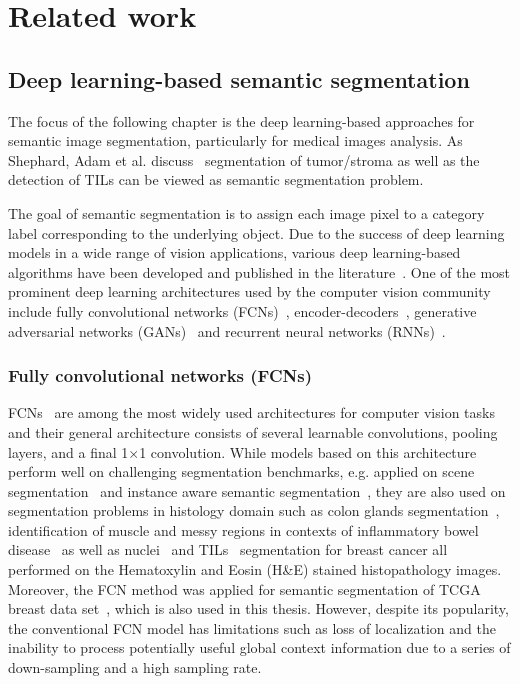 \chapter{Related work}
\section{Deep learning-based semantic segmentation}
The focus of the following chapter is the deep learning-based approaches for semantic image segmentation, particularly for medical images analysis. As Shephard, Adam et al. discuss~\cite{shephard2022tiager} segmentation of tumor/stroma as well as the detection of TILs can be viewed as semantic segmentation problem. 

The goal of semantic segmentation is to assign each image pixel to a category label corresponding to the underlying object. Due to the success of deep learning models in a wide range of vision applications, various deep learning-based algorithms have been developed and published in the literature~\cite{minaee2021image}. One of the most prominent deep learning architectures used by the computer vision community include fully convolutional networks (FCNs)~\cite{long2015fully}, encoder-decoders~\cite{noh2015learning}, generative adversarial networks (GANs)~\cite{goodfellow2014generative} and recurrent neural networks (RNNs)~\cite{rumelhart1986learning}.

\subsection{Fully convolutional networks (FCNs)}
FCNs~\cite{long2015fully} are among the most widely used architectures for computer vision tasks and their general architecture consists of several learnable convolutions, pooling layers, and a final 1$\times$1 convolution. While models based on this architecture perform well on challenging segmentation benchmarks, e.g. applied on scene segmentation~\cite{yu2020context} and instance aware semantic segmentation~\cite{li2017fully}, they are also used on segmentation problems in histology domain such as colon glands segmentation~\cite{bentaieb2016topology}, identification of muscle and messy regions in contexts of inflammatory bowel disease~\cite{wang2016deep} as well as nuclei~\cite{natarajan2020segmentation} and TILs~\cite{amgad2019joint} segmentation for breast cancer all performed on the Hematoxylin and Eosin (H\&E) stained histopathology images. Moreover, the FCN method was applied for semantic segmentation of TCGA~\cite{gutman2013cancer} breast data set~\cite{amgad2019structured}, which is also used in this thesis. However, despite its popularity, the conventional FCN model has limitations such as loss of localization and the inability to process potentially useful global context information due to a series of down-sampling and a high sampling rate.

